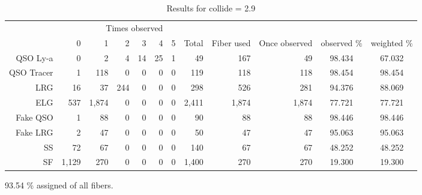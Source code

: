 \documentclass{extarticle}
\begin{document}
\begin{table}[H]\begin{center}
\begin{tabular}{rrrrrrrrrrcc}
\hline
\multicolumn{6}{r}{Times observed} \\
	~ &           0 &     1 &  2 & 3 & 4 & 5 &  Total & Fiber used & Once observed & observed $\%$ & weighted $\%$ \\ \hline
   QSO Ly-a   &     0 &     2 &   4 & 14 & 25 & 1 &    49 &   167 &    49 & 98.434 & 67.032\\ 
 QSO Tracer   &     1 &   118 &   0 &  0 &  0 & 0 &   119 &   118 &   118 & 98.454 & 98.454\\ 
        LRG   &    16 &    37 & 244 &  0 &  0 & 0 &   298 &   526 &   281 & 94.376 & 88.069\\ 
        ELG   &   537 & 1,874 &   0 &  0 &  0 & 0 & 2,411 & 1,874 & 1,874 & 77.721 & 77.721\\ 
   Fake QSO   &     1 &    88 &   0 &  0 &  0 & 0 &    90 &    88 &    88 & 98.446 & 98.446\\ 
   Fake LRG   &     2 &    47 &   0 &  0 &  0 & 0 &    50 &    47 &    47 & 95.063 & 95.063\\ 
         SS   &    72 &    67 &   0 &  0 &  0 & 0 &   140 &    67 &    67 & 48.252 & 48.252\\ 
         SF   & 1,129 &   270 &   0 &  0 &  0 & 0 & 1,400 &   270 &   270 & 19.300 & 19.300\\ 
\hline
\end{tabular}
\caption{Results for collide = 2.9}\label{29}
\end{center}\end{table}
93.54 \% assigned of all fibers.
\end{document}
